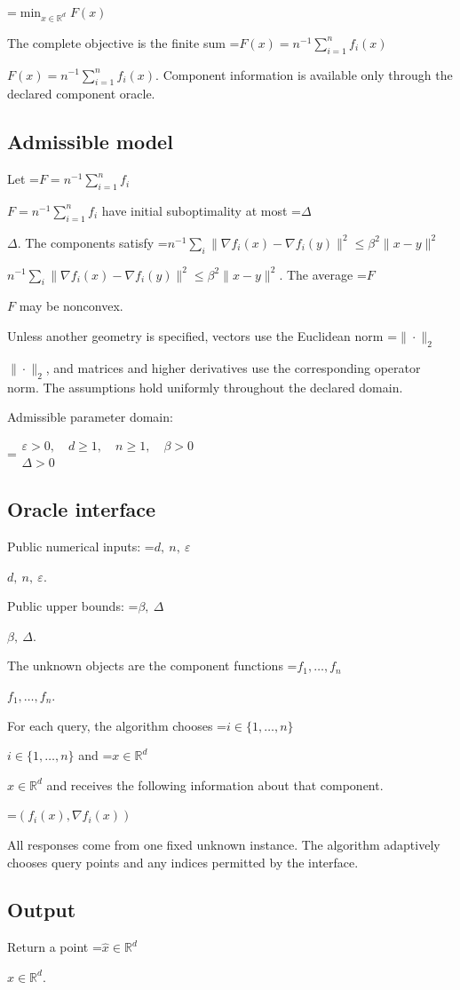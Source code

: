 \documentclass[10pt,a4paper]{article}
\newcommand{\AtlasMath}[1]{\par\begingroup\centering\setbox0=\hbox{$\displaystyle #1$}\ifdim\wd0>1.4\linewidth\typeout{ATLAS WIDE FORMULA: \the\wd0}\fi\ifdim\wd0>\linewidth\resizebox{\linewidth}{!}{\box0}\else\box0\fi\par\endgroup}
\newcommand{\AtlasInlineMath}[1]{\begingroup\setbox0=\hbox{$#1$}\ifdim\wd0>.4\linewidth\endgroup\AtlasMath{#1}\else\endgroup$#1$\fi}
\begin{document}
\AtlasMath{\min_{x\in \mathbb{R}^d}F(x)}


The complete objective is the finite sum \AtlasInlineMath{F(x)=n^{-1}\sum_{i=1}^n f_i(x)}. Component information is available only through the declared component oracle.

\subsection{Admissible model}
Let \AtlasInlineMath{F=n^{-1}\sum_{i=1}^n f_i} have initial suboptimality at most \AtlasInlineMath{\Delta}. The components satisfy \AtlasInlineMath{n^{-1}\sum_i\|\nabla f_i(x)-\nabla f_i(y)\|^2\le\beta^2\|x-y\|^2}. The average \AtlasInlineMath{F} may be nonconvex.

Unless another geometry is specified, vectors use the Euclidean norm \AtlasInlineMath{\|\cdot\|_2}, and matrices and higher derivatives use the corresponding operator norm. The assumptions hold uniformly throughout the declared domain.

Admissible parameter domain:


\AtlasMath{\begin{gathered}\varepsilon > 0,\quad d \ge 1,\quad n \ge 1,\quad \beta > 0\\\Delta > 0\end{gathered}}


\subsection{Oracle interface}
Public numerical inputs: \AtlasInlineMath{d,\ n,\ \varepsilon}.

Public upper bounds: \AtlasInlineMath{\beta,\ \Delta}.

The unknown objects are the component functions \AtlasInlineMath{f_1,\ldots,f_n}.

For each query, the algorithm chooses \AtlasInlineMath{i\in\{1,\ldots,n\}} and \AtlasInlineMath{x\in\mathbb R^d} and receives the following information about that component.


\AtlasMath{(f_i(x),\nabla f_i(x))}


All responses come from one fixed unknown instance. The algorithm adaptively chooses query points and any indices permitted by the interface.

\subsection{Output}
Return a point \AtlasInlineMath{\widehat x\in\mathbb R^d}.
\end{document}
